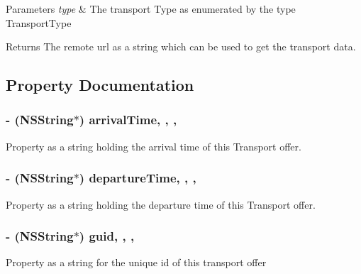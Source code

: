 \begin{DoxyParams}{Parameters}
{\em type} & The transport Type as enumerated by the type Transport\+Type\\
\hline
\end{DoxyParams}
\begin{DoxyReturn}{Returns}
The remote url as a string which can be used to get the transport data. 
\end{DoxyReturn}


\subsection{Property Documentation}
\subsubsection[{\texorpdfstring{arrival\+Time}{arrivalTime}}]{\setlength{\rightskip}{0pt plus 5cm}-\/ (N\+S\+String$\ast$) arrival\+Time\hspace{0.3cm}{\ttfamily [read]}, {\ttfamily [write]}, {\ttfamily [nonatomic]}, {\ttfamily [retain]}}\hypertarget{interface_transport_model_ad39126b328fba5e2eaff6ac49bbeeba0}{}\label{interface_transport_model_ad39126b328fba5e2eaff6ac49bbeeba0}
Property as a string holding the arrival time of this Transport offer. 
\subsubsection[{\texorpdfstring{departure\+Time}{departureTime}}]{\setlength{\rightskip}{0pt plus 5cm}-\/ (N\+S\+String$\ast$) departure\+Time\hspace{0.3cm}{\ttfamily [read]}, {\ttfamily [write]}, {\ttfamily [nonatomic]}, {\ttfamily [retain]}}\hypertarget{interface_transport_model_ac4604d8d548b906e8ab95e3d128c849f}{}\label{interface_transport_model_ac4604d8d548b906e8ab95e3d128c849f}
Property as a string holding the departure time of this Transport offer. 
\subsubsection[{\texorpdfstring{guid}{guid}}]{\setlength{\rightskip}{0pt plus 5cm}-\/ (N\+S\+String$\ast$) guid\hspace{0.3cm}{\ttfamily [read]}, {\ttfamily [write]}, {\ttfamily [nonatomic]}, {\ttfamily [retain]}}\hypertarget{interface_transport_model_a3a1135bb3c34dbd31fe7d6a6a329525e}{}\label{interface_transport_model_a3a1135bb3c34dbd31fe7d6a6a329525e}
Property as a string for the unique id of this transport offer 
